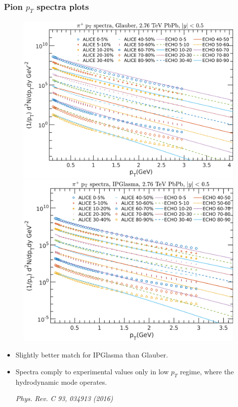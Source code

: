 \documentclass[aspectratio=1610]{beamer}
\begin{document}

\begin{frame}

\frametitle{Pion $p_T$ spectra plots}

\begin{figure}
\includegraphics[scale=0.22]{figs/pT-spec_3Dgeometric.png}
\includegraphics[scale=0.22]{figs/pT-spec_IPGlasma.png}
\end{figure}

\begin{itemize}
\item Slightly better match for IPGlasma than Glauber. 

\item Spectra comply to experimental values only in low $p_T$ regime, where the hydrodynamic mode operates.

\textit{Phys. Rev. C 93, 034913 (2016)}

\end{itemize}


\end{frame}
\end{document}
